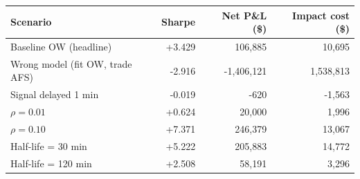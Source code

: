 \begin{tabular}{lrrr}
\toprule
Scenario & Sharpe & Net P\&L (\$) & Impact cost (\$) \\
\midrule
Baseline OW (headline) & +3.429 & 106,885 & 10,695 \\
Wrong model (fit OW, trade AFS) & -2.916 & -1,406,121 & 1,538,813 \\
Signal delayed 1 min & -0.019 & -620 & -1,563 \\
$\rho=0.01$ & +0.624 & 20,000 & 1,996 \\
$\rho=0.10$ & +7.371 & 246,379 & 13,067 \\
Half-life = 30 min & +5.222 & 205,883 & 14,772 \\
Half-life = 120 min & +2.508 & 58,191 & 3,296 \\
\bottomrule
\end{tabular}